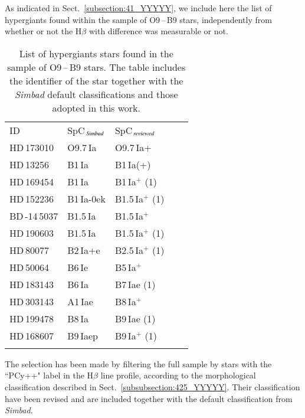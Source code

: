 \documentclass{aa}
\begin{document}
\begin{appendix}
As indicated in Sect.~\ref{subsection:41_YYYYY}, we include here the list of hypergiants found within the sample of O9\,--\,B9 stars, independently from whether or not the H$\beta$ with difference was measurable or not.

\begin{table}[h]
\caption{List of hypergiants stars found in the sample of O9\,--\,B9 stars. The table includes the identifier of the star together with the \textit{Simbad} default classifications and those adopted in this work.}
\label{tab:hypergiants}
    \centering
    \begin{tabular}{lllll}
        ID & SpC$_{\textit{\,Simbad}}$ & SpC$_{\textit{\,reviewed}}$ \\
        \noalign{\smallskip}\hline\noalign{\smallskip}\smallskip
        HD\,173010     & O9.7\,Ia   & O9.7\,Ia+ \\\smallskip %
        HD\,13256      & B1\,Ia     & B1\,Ia(+) \\\smallskip %
        HD\,169454     & B1\,Ia     & B1\,Ia$^+$ (1) \\\smallskip
        HD\,152236     & B1\,Ia-0ek & B1.5\,Ia$^+$ (1) \\\smallskip
        BD\,-14\,5037  & B1.5\,Ia   & B1.5\,Ia$^+$ \\\smallskip %
        HD\,190603     & B1.5\,Ia   & B1.5\,Ia$^+$ (1) \\\smallskip
        HD\,80077      & B2\,Ia+e   & B2.5\,Ia$^+$ (1) \\\smallskip
        HD\,50064      & B6\,Ie     & B5\,Ia$^+$ \\\smallskip %
        HD\,183143     & B6\,Ia     & B7\,Iae (1) \\\smallskip
        HD\,303143     & A1\,Iae    & B8\,Ia$^+$ \\\smallskip %
        HD\,199478     & B8\,Ia     & B9\,Iae (1) \\\smallskip
        HD\,168607     & B9\,Iaep   & B9\,Ia$^+$ (1) \\
        \noalign{\smallskip}\hline
    \end{tabular}
\end{table}

The selection has been made by filtering the full sample by stars with the ``PCy++" label in the H$\beta$ line profile, according to the morphological classification described in Sect.~\ref{subsubsection:425_YYYYY}. Their classification have been revised and are included together with the default classification from \textit{Simbad}.


\end{appendix}
\end{document}
